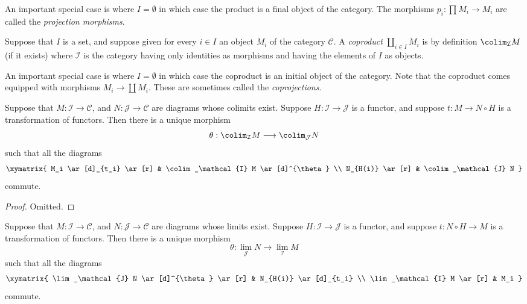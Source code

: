 \noindent
An important special case is where $I = \emptyset$ in which case the
product is a final object of the category.
The morphisms $p_i : \prod M_i \to M_i$ are called the
{\it projection morphisms}.

\begin{definition}
\label{definition-coproduct}
Suppose that $I$ is a set, and suppose given for every $i \in I$ an
object $M_i$ of the category $\mathcal{C}$. A {\it coproduct}
$\coprod_{i\in I} M_i$ is by definition $\colim_\mathcal{I} M$
(if it exists) where $\mathcal{I}$ is the category having only
identities as morphisms and having the elements of $I$ as objects.
\end{definition}

\noindent
An important special case is where $I = \emptyset$ in which case the
coproduct is an initial object of the category.
Note that the coproduct comes equipped with morphisms
$M_i \to \coprod M_i$. These are sometimes called the
{\it coprojections}.

\begin{lemma}
\label{lemma-functorial-colimit}
Suppose that $M : \mathcal{I} \to \mathcal{C}$,
and $N : \mathcal{J} \to \mathcal{C}$ are diagrams
whose colimits exist. Suppose
$H : \mathcal{I} \to \mathcal{J}$ is
a functor, and suppose $t : M \to N \circ H$
is a transformation of functors.
Then there is a unique morphism
$$
\theta :
\colim_\mathcal{I} M
\longrightarrow
\colim_\mathcal{J} N
$$
such that all the diagrams
$$
\xymatrix{
M_i \ar[d]_{t_i} \ar[r]
&
\colim_\mathcal{I} M \ar[d]^{\theta}
\\
N_{H(i)} \ar[r]
&
\colim_\mathcal{J} N
}
$$
commute.
\end{lemma}

\begin{proof}
Omitted.
\end{proof}

\begin{lemma}
\label{lemma-functorial-limit}
Suppose that $M : \mathcal{I} \to \mathcal{C}$,
and $N : \mathcal{J} \to \mathcal{C}$ are diagrams
whose limits exist. Suppose $H : \mathcal{I} \to \mathcal{J}$ is
a functor, and suppose $t : N \circ H \to M$
is a transformation of functors.
Then there is a unique morphism
$$
\theta :
\lim_\mathcal{J} N
\longrightarrow
\lim_\mathcal{I} M
$$
such that all the diagrams
$$
\xymatrix{
\lim_\mathcal{J} N \ar[d]^{\theta} \ar[r]
&
N_{H(i)} \ar[d]_{t_i}
\\
\lim_\mathcal{I} M \ar[r]
&
M_i
}
$$
commute.
\end{lemma}

